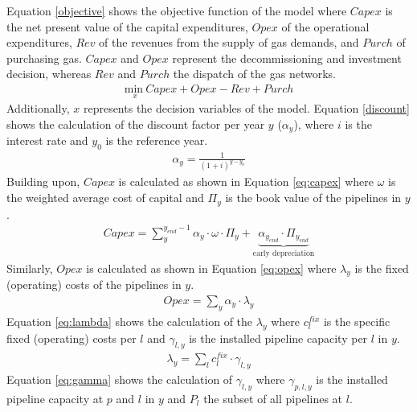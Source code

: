  Equation \ref{objective} shows the objective function of the model where $Capex$ is the net present value of the capital expenditures, $Opex$ of the operational expenditures, $Rev$ of the revenues from the supply of gas demands, and $Purch$ of purchasing gas. $Capex$ and $Opex$ represent the decommissioning and investment decision, whereas $Rev$ and $Purch$ the dispatch of the gas networks.  
 \begin{align}\label{objective}
  	\underset{x}{\mathrm{min~}} Capex + Opex - Rev + Purch
  \end{align}
Additionally, $x$ represents the decision variables of the model.  Equation \ref{discount} shows the calculation of the discount factor per year $y$ ($\alpha_y$), where $i$ is the interest rate and $y_0$ is the reference year. 
\begin{align}\label{discount}
	\alpha_y = \frac{1}{(1+i)^{y-y_0}}
 \end{align}
Building upon, $Capex$ is calculated as shown in Equation \ref{eq:capex} where $\omega$ is the weighted average cost of capital and $\Pi_y$ is the book value of the pipelines in $y$.
\begin{align}\label{eq:capex}
	Capex = \sum_{y}^{y_{end}-1} \alpha_y \cdot \omega \cdot \Pi_y + \underbrace{\alpha_{y_{end}} \cdot \Pi_{y_{end}}}_{\text{early depreciation}}	
\end{align}
Similarly, $Opex$ is calculated as shown in Equation \ref{eq:opex} where $\lambda_y$ is the fixed (operating) costs of the pipelines in $y$. 
\begin{align}\label{eq:opex}
	Opex = \sum_{y} \alpha_y \cdot \lambda_y
\end{align}
Equation \ref{eq:lambda} shows the calculation of the $\lambda_y$ where $c^{fix}_{l}$ is the specific fixed (operating) costs per $l$ and $\gamma_{l, y}$ is the installed pipeline capacity per $l$ in $y$.
\begin{align}\label{eq:lambda}
	\lambda_y = \sum_{l} c^{fix}_{l} \cdot \gamma_{l, y}
\end{align}
Equation \ref{eq:gamma} shows the calculation of $\gamma_{l, y}$ where $\gamma_{p,l,y}$ is the installed pipeline capacity at $p$ and $l$ in $y$ and $P_{l}$ the subset of all pipelines at $l$. 
